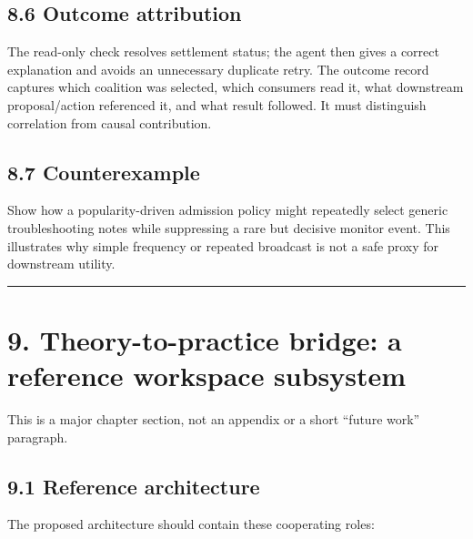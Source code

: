 \subsection{8.6 Outcome attribution}\label{86-outcome-attribution}

The read-only check resolves settlement status; the agent then gives a correct explanation and avoids an unnecessary duplicate retry. The outcome record captures which coalition was selected, which consumers read it, what downstream proposal/action referenced it, and what result followed. It must distinguish correlation from causal contribution.

\subsection{8.7 Counterexample}\label{87-counterexample}

Show how a popularity-driven admission policy might repeatedly select generic troubleshooting notes while suppressing a rare but decisive monitor event. This illustrates why simple frequency or repeated broadcast is not a safe proxy for downstream utility.

\begin{center}\rule{0.5\linewidth}{0.5pt}\end{center}

\section{9. Theory-to-practice bridge: a reference workspace subsystem}\label{9-theory-to-practice-bridge-a-reference-workspace-subsystem}

This is a major chapter section, not an appendix or a short ``future work'' paragraph.

\subsection{9.1 Reference architecture}\label{91-reference-architecture}

The proposed architecture should contain these cooperating roles:

